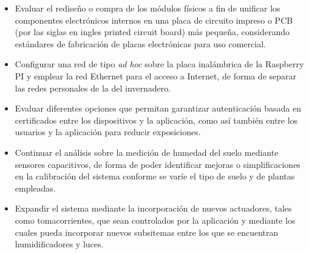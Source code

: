 \begin{itemize}
\item Evaluar el rediseño o compra de los módulos físicos a fin de unificar los componentes electrónicos internos en una placa de circuito impreso o PCB (por las siglas en ingles printed circuit board) más pequeña, considerando estándares de fabricación de placas electrónicas para uso comercial.

\item Configurar una red de tipo \textit{ad hoc} sobre la placa inalámbrica de la Raspberry PI y emplear la red Ethernet para el acceso a Internet, de forma de separar las redes personales de la del invernadero.

\item Evaluar diferentes opciones que permitan garantizar autenticación basada en certificados entre los dispositivos y la aplicación, como así también entre los usuarios y la aplicación para reducir exposiciones.

\item Continuar el análisis sobre la medición de humedad del suelo mediante sensores capacitivos, de forma de poder identificar mejoras o simplificaciones en la calibración del sistema conforme se varíe el tipo de suelo y de plantas empleadas. 

\item Expandir el sistema mediante la incorporación de nuevos actuadores, tales como tomacorrientes, que sean controlados por la aplicación y mediante los cuales pueda incorporar nuevos subsitemas entre los que se encuentran humidificadores y luces. 

\end{itemize}